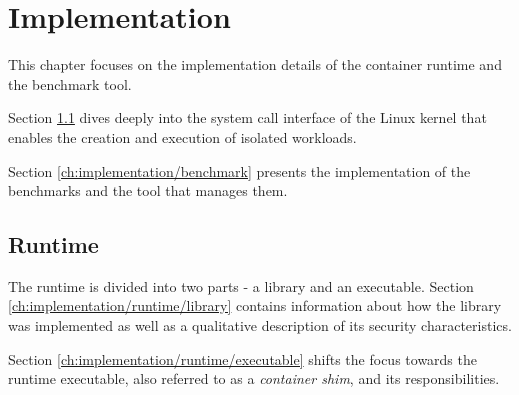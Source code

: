 \chapter{Implementation}
This chapter focuses on the implementation details of the container runtime 
and the benchmark tool. 

Section \ref{ch:implementation/runtime} dives deeply into the 
system call interface of the Linux kernel that enables the creation and execution 
of isolated workloads.

Section \ref{ch:implementation/benchmark} presents the implementation of the benchmarks
and the tool that manages them. 

\label{ch:implementation}
\section{Runtime}
\label{ch:implementation/runtime}
The runtime is divided into two parts - a library and an executable.
Section \ref{ch:implementation/runtime/library} contains information about how 
the library was implemented as well as a qualitative description of its security characteristics.

Section \ref{ch:implementation/runtime/executable} shifts the focus towards the runtime executable,
also referred to as a \textit{container shim}, and its responsibilities.
